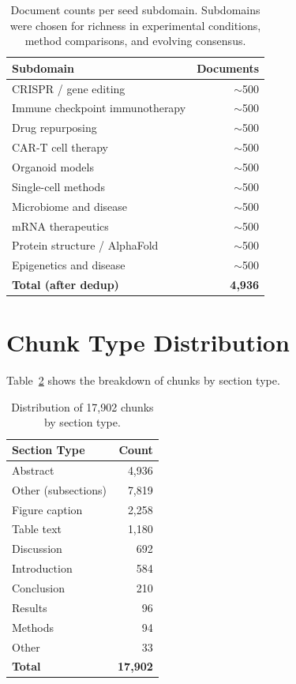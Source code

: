\documentclass{article}
\begin{document}
\begin{table}[h]
\centering
\caption{Document counts per seed subdomain. Subdomains were chosen for richness in experimental conditions, method comparisons, and evolving consensus.}
\small
\begin{tabular}{lr}
\toprule
\textbf{Subdomain} & \textbf{Documents} \\
\midrule
CRISPR / gene editing & ${\sim}$500 \\
Immune checkpoint immunotherapy & ${\sim}$500 \\
Drug repurposing & ${\sim}$500 \\
CAR-T cell therapy & ${\sim}$500 \\
Organoid models & ${\sim}$500 \\
Single-cell methods & ${\sim}$500 \\
Microbiome and disease & ${\sim}$500 \\
mRNA therapeutics & ${\sim}$500 \\
Protein structure / AlphaFold & ${\sim}$500 \\
Epigenetics and disease & ${\sim}$500 \\
\midrule
\textbf{Total (after dedup)} & \textbf{4,936} \\
\bottomrule
\end{tabular}
\label{tab:subdomains}
\end{table}

\section{Chunk Type Distribution}
\label{app:chunks}

Table~\ref{tab:chunks} shows the breakdown of chunks by section type.

\begin{table}[h]
\centering
\caption{Distribution of 17,902 chunks by section type.}
\small
\begin{tabular}{lr}
\toprule
\textbf{Section Type} & \textbf{Count} \\
\midrule
Abstract & 4,936 \\
Other (subsections) & 7,819 \\
Figure caption & 2,258 \\
Table text & 1,180 \\
Discussion & 692 \\
Introduction & 584 \\
Conclusion & 210 \\
Results & 96 \\
Methods & 94 \\
Other & 33 \\
\midrule
\textbf{Total} & \textbf{17,902} \\
\bottomrule
\end{tabular}
\label{tab:chunks}
\end{table}
\end{document}
